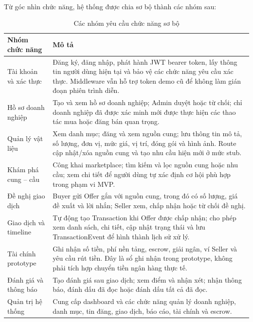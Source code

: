 \documentclass[12pt,a4paper,oneside]{report}
\begin{document}
Từ góc nhìn chức năng, hệ thống được chia sơ bộ thành các nhóm sau:

\begin{table}[htbp]
  \centering
  \caption{Các nhóm yêu cầu chức năng sơ bộ}
  \label{tab:nhom-chuc-nang}
  \begin{tabularx}{\textwidth}{p{3.5cm}Y}
    \toprule
    \textbf{Nhóm chức năng} & \textbf{Mô tả} \\
    \midrule
    Tài khoản và xác thực &
    Đăng ký, đăng nhập, phát hành JWT bearer token, lấy thông tin người dùng hiện
    tại và bảo vệ các chức năng yêu cầu xác thực. Middleware vẫn hỗ trợ token
    demo cũ để không làm gián đoạn phiên trình diễn. \\

    Hồ sơ doanh nghiệp &
    Tạo và xem hồ sơ doanh nghiệp; Admin duyệt hoặc từ chối; chỉ doanh nghiệp đã
    được xác minh mới được thực hiện các thao tác mua hoặc đăng bán quan trọng. \\

    Quản lý vật liệu &
    Xem danh mục; đăng và xem nguồn cung; lưu thông tin mô tả, số lượng, đơn vị,
    mức giá, vị trí, đóng gói và hình ảnh. Route cập nhật/xóa nguồn cung và tạo
    nhu cầu hiện mới ở mức stub. \\

    Khám phá cung -- cầu &
    Công khai marketplace; tìm kiếm và lọc nguồn cung hoặc nhu cầu; xem chi tiết
    để người dùng tự xác định cơ hội phù hợp trong phạm vi MVP. \\

    Đề nghị giao dịch &
    Buyer gửi Offer gắn với nguồn cung, trong đó có số lượng, giá đề xuất và lời
    nhắn; Seller xem, chấp nhận hoặc từ chối đề nghị. \\

    Giao dịch và timeline &
    Tự động tạo Transaction khi Offer được chấp nhận; cho phép xem danh sách,
    chi tiết, cập nhật trạng thái và lưu TransactionEvent để hình thành lịch sử
    xử lý. \\

    Tài chính prototype &
    Ghi nhận số tiền, phí nền tảng, escrow, giải ngân, ví Seller và yêu cầu rút
    tiền. Đây là sổ ghi nhận trong prototype, không phải tích hợp chuyển tiền
    ngân hàng thực tế. \\

    Đánh giá và thông báo &
    Tạo đánh giá sau giao dịch; xem điểm và nhận xét; nhận thông báo, đánh dấu đã
    đọc hoặc đánh dấu tất cả đã đọc. \\

    Quản trị hệ thống &
    Cung cấp dashboard và các chức năng quản lý doanh nghiệp, danh mục, tin đăng,
    giao dịch, báo cáo, tài chính và escrow. \\
    \bottomrule
  \end{tabularx}
\end{table}
\end{document}
